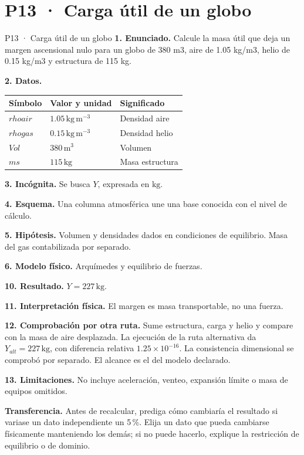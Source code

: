 \chapter*{P13 · Carga útil de un globo}
\begin{studiumworked}{P13 · Carga útil de un globo}
\textbf{1. Enunciado.} Calcule la masa útil que deja un margen ascensional nulo para un globo de 380 m3, aire de 1.05 kg/m3, helio de 0.15 kg/m3 y estructura de 115 kg.

\textbf{2. Datos.}
\begin{longtable}{p{.16\linewidth}p{.35\linewidth}p{.38\linewidth}}\toprule Símbolo & Valor y unidad & Significado\\\midrule\endhead
$rhoair$ & $1.05\,\mathrm{kg\,m^{-3}}$ & Densidad aire\\
$rhogas$ & $0.15\,\mathrm{kg\,m^{-3}}$ & Densidad helio\\
$Vol$ & $380\,\mathrm{m^3}$ & Volumen\\
$ms$ & $115\,\mathrm{kg}$ & Masa estructura\\
\bottomrule\end{longtable}
\textbf{3. Incógnita.} Se busca $Y$, expresada en $\mathrm{kg}$.

\textbf{4. Esquema.} Una columna atmosférica une una base conocida con el nivel de cálculo.

\textbf{5. Hipótesis.} Volumen y densidades dados en condiciones de equilibrio. Masa del gas contabilizada por separado.

\textbf{6. Modelo físico.} Arquímedes y equilibrio de fuerzas.


\textbf{10. Resultado.} $Y=227\,\mathrm{kg}$.

\textbf{11. Interpretación física.} El margen es masa transportable, no una fuerza.

\textbf{12. Comprobación por otra ruta.} Sume estructura, carga y helio y compare con la masa de aire desplazada. La ejecución de la ruta alternativa da $Y_{alt}=227\,\mathrm{kg}$, con diferencia relativa $1.25\times10^{-16}$. La consistencia dimensional se comprobó por separado. El alcance es el del modelo declarado.

\textbf{13. Limitaciones.} No incluye aceleración, venteo, expansión límite o masa de equipos omitidos.

\textbf{Transferencia.} Antes de recalcular, prediga cómo cambiaría el resultado si variase un dato independiente un 5\,\%. Elija un dato que pueda cambiarse físicamente manteniendo los demás; si no puede hacerlo, explique la restricción de equilibrio o de dominio.\par
\end{studiumworked}
